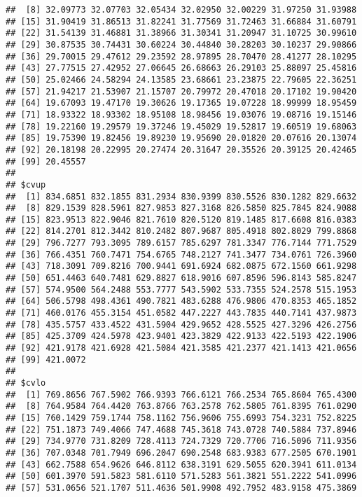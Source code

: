\documentclass[]{article}
\begin{document}
\begin{verbatim}
##  [8] 32.09773 32.07703 32.05434 32.02950 32.00229 31.97250 31.93988
## [15] 31.90419 31.86513 31.82241 31.77569 31.72463 31.66884 31.60791
## [22] 31.54139 31.46881 31.38966 31.30341 31.20947 31.10725 30.99610
## [29] 30.87535 30.74431 30.60224 30.44840 30.28203 30.10237 29.90866
## [36] 29.70015 29.47612 29.23592 28.97895 28.70470 28.41277 28.10295
## [43] 27.77515 27.42952 27.06645 26.68663 26.29103 25.88097 25.45816
## [50] 25.02466 24.58294 24.13585 23.68661 23.23875 22.79605 22.36251
## [57] 21.94217 21.53907 21.15707 20.79972 20.47018 20.17102 19.90420
## [64] 19.67093 19.47170 19.30626 19.17365 19.07228 18.99999 18.95459
## [71] 18.93322 18.93302 18.95108 18.98456 19.03076 19.08716 19.15146
## [78] 19.22160 19.29579 19.37246 19.45029 19.52817 19.60519 19.68063
## [85] 19.75390 19.82456 19.89230 19.95690 20.01820 20.07616 20.13074
## [92] 20.18198 20.22995 20.27474 20.31647 20.35526 20.39125 20.42465
## [99] 20.45557
## 
## $cvup
##  [1] 834.6851 832.1855 831.2934 830.9399 830.5526 830.1282 829.6632
##  [8] 829.1539 828.5961 827.9853 827.3168 826.5850 825.7845 824.9088
## [15] 823.9513 822.9046 821.7610 820.5120 819.1485 817.6608 816.0383
## [22] 814.2701 812.3442 810.2482 807.9687 805.4918 802.8029 799.8868
## [29] 796.7277 793.3095 789.6157 785.6297 781.3347 776.7144 771.7529
## [36] 766.4351 760.7471 754.6765 748.2127 741.3477 734.0761 726.3960
## [43] 718.3091 709.8216 700.9441 691.6924 682.0875 672.1560 661.9298
## [50] 651.4463 640.7481 629.8827 618.9016 607.8596 596.8143 585.8247
## [57] 574.9500 564.2488 553.7777 543.5902 533.7355 524.2578 515.1953
## [64] 506.5798 498.4361 490.7821 483.6288 476.9806 470.8353 465.1852
## [71] 460.0176 455.3154 451.0582 447.2227 443.7835 440.7141 437.9873
## [78] 435.5757 433.4522 431.5904 429.9652 428.5525 427.3296 426.2756
## [85] 425.3709 424.5978 423.9401 423.3829 422.9133 422.5193 422.1906
## [92] 421.9178 421.6928 421.5084 421.3585 421.2377 421.1413 421.0656
## [99] 421.0072
## 
## $cvlo
##  [1] 769.8656 767.5902 766.9393 766.6121 766.2534 765.8604 765.4300
##  [8] 764.9584 764.4420 763.8766 763.2578 762.5805 761.8395 761.0290
## [15] 760.1429 759.1744 758.1162 756.9606 755.6993 754.3231 752.8225
## [22] 751.1873 749.4066 747.4688 745.3618 743.0728 740.5884 737.8946
## [29] 734.9770 731.8209 728.4113 724.7329 720.7706 716.5096 711.9356
## [36] 707.0348 701.7949 696.2047 690.2548 683.9383 677.2505 670.1901
## [43] 662.7588 654.9626 646.8112 638.3191 629.5055 620.3941 611.0134
## [50] 601.3970 591.5823 581.6110 571.5283 561.3821 551.2222 541.0996
## [57] 531.0656 521.1707 511.4636 501.9908 492.7952 483.9158 475.3869

\end{verbatim}
\end{document}

